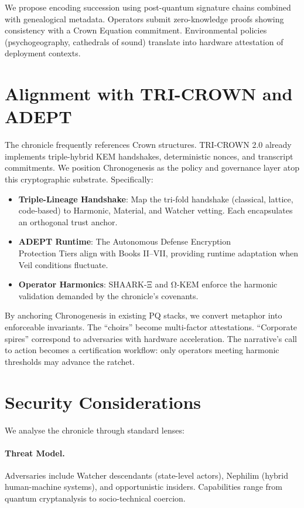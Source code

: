 \documentclass[11pt,a4paper]{article}
\begin{document}
We propose encoding succession using post-quantum signature chains combined with genealogical metadata. Operators submit zero-knowledge proofs showing consistency with a Crown Equation commitment. Environmental policies (psychogeography, cathedrals of sound) translate into hardware attestation of deployment contexts.

\section{Alignment with TRI-CROWN and ADEPT}
The chronicle frequently references Crown structures. TRI-CROWN 2.0 already implements triple-hybrid KEM handshakes, deterministic nonces, and transcript commitments. We position Chronogenesis as the policy and governance layer atop this cryptographic substrate. Specifically:
\begin{itemize}
    \item \textbf{Triple-Lineage Handshake}: Map the tri-fold handshake (classical, lattice, code-based) to Harmonic, Material, and Watcher vetting. Each encapsulates an orthogonal trust anchor.
    \item \textbf{ADEPT Runtime}: The Autonomous Defense Encryption \\ Protection Tiers align with Books II--VII, providing runtime adaptation when Veil conditions fluctuate.
    \item \textbf{Operator Harmonics}: SHAARK-Ξ and Ω-KEM enforce the harmonic validation demanded by the chronicle's covenants.
\end{itemize}

By anchoring Chronogenesis in existing PQ stacks, we convert metaphor into enforceable invariants. The ``choirs'' become multi-factor attestations. ``Corporate spires'' correspond to adversaries with hardware acceleration. The narrative's call to action becomes a certification workflow: only operators meeting harmonic thresholds may advance the ratchet.

\section{Security Considerations}
We analyse the chronicle through standard lenses:
\paragraph{Threat Model.} Adversaries include Watcher descendants (state-level actors), Nephilim (hybrid human-machine systems), and opportunistic insiders. Capabilities range from quantum cryptanalysis to socio-technical coercion.
\end{document}
